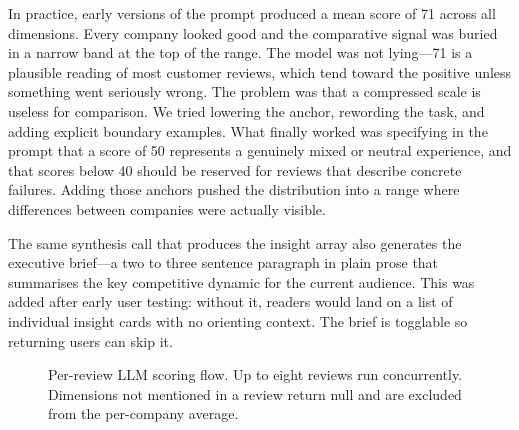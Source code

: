 \documentclass[9pt, a4paper, twocolumn]{article}
\begin{document}
In practice, early versions of the prompt produced a mean score of 71 across all dimensions. Every company looked good and the comparative signal was buried in a narrow band at the top of the range. The model was not lying---71 is a plausible reading of most customer reviews, which tend toward the positive unless something went seriously wrong. The problem was that a compressed scale is useless for comparison. We tried lowering the anchor, rewording the task, and adding explicit boundary examples. What finally worked was specifying in the prompt that a score of 50 represents a genuinely mixed or neutral experience, and that scores below 40 should be reserved for reviews that describe concrete failures. Adding those anchors pushed the distribution into a range where differences between companies were actually visible.

The same synthesis call that produces the insight array also generates the executive brief---a two to three sentence paragraph in plain prose that summarises the key competitive dynamic for the current audience. This was added after early user testing: without it, readers would land on a list of individual insight cards with no orienting context. The brief is togglable so returning users can skip it.

\begin{figure}[h]
\centering
{}
\caption{\footnotesize Per-review LLM scoring flow. Up to eight reviews run concurrently. Dimensions not mentioned in a review return null and are excluded from the per-company average.}
\label{fig:scoring}
\end{figure}
\end{document}
